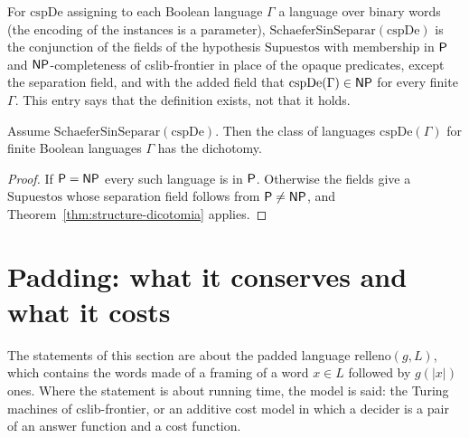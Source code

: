 \begin{definition}
  \label{def:structure-schaefer-sin-separar}
  \leanok
  For $\mathrm{cspDe}$ assigning to each Boolean language $\Gamma$ a language over binary words (the
  encoding of the instances is a parameter), $\mathrm{SchaeferSinSeparar}(\mathrm{cspDe})$ is the
  conjunction of the fields of the hypothesis $\mathrm{Supuestos}$ with membership in $\mathsf{P}$ and
  $\mathsf{NP}$-completeness of cslib-frontier in place of the opaque predicates, except the separation
  field, and with the added field that $\mathrm{cspDe}(\Gamma) \in \mathsf{NP}$ for every finite $\Gamma$.
  This entry says that the definition exists, not that it holds.
  \own{}
\end{definition}

\begin{theorem}
  \label{thm:structure-schaefer-bz}
  \leanok
  Assume $\mathrm{SchaeferSinSeparar}(\mathrm{cspDe})$. Then the class of languages $\mathrm{cspDe}(\Gamma)$
  for finite Boolean languages $\Gamma$ has the dichotomy.
  \own{}
\end{theorem}

\begin{proof}
  \leanok
  If $\mathsf{P} = \mathsf{NP}$ every such language is in $\mathsf{P}$. Otherwise the fields give a
  $\mathrm{Supuestos}$ whose separation field follows from $\mathsf{P} \neq \mathsf{NP}$, and
  Theorem~\ref{thm:structure-dicotomia} applies.
\end{proof}

\section{Padding: what it conserves and what it costs}
\label{sec:structure-padding}

The statements of this section are about the padded language $\mathrm{relleno}(g, L)$, which
contains the words made of a framing of a word $x \in L$ followed by $g(|x|)$ ones. Where the
statement is about running time, the model is said: the Turing machines of cslib-frontier, or an
additive cost model in which a decider is a pair of an answer function and a cost function.


